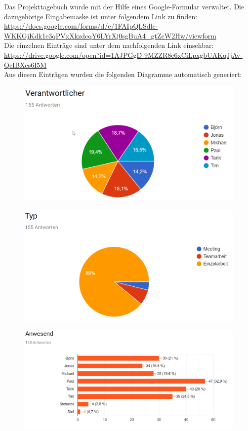 Das Projekttagebuch wurde mit der Hilfe eines Google-Formular verwaltet. Die dazugehörige Eingabemaske ist unter folgendem Link zu finden: \url{https://docs.google.com/forms/d/e/1FAIpQLSdlc-WKKGjKdk1e3qPVxXkzdcqY6LYrXj0sgBuA4_gtZcW2Hw/viewform}\\
Die einzelnen Einträge sind unter dem nachfolgenden Link einsehbar: \url{https://drive.google.com/open?id=1AJPGgD-9MZZR8e6xCiLpxgbUAKqJjAv-QcIBXes6I5M}\\
Aus diesen Einträgen wurden die folgenden Diagramme automatisch generiert:

\begin{figure}[H]
    \centering
    \includegraphics[width=\textwidth]{../Endabnahme/images/Verantwortlicher_Chart.png}
\end{figure}

\begin{figure}[H]
    \centering
    \includegraphics[width=\textwidth]{../Endabnahme/images/Typ_Chart.png}
\end{figure}

\begin{figure}[H]
    \centering
    \includegraphics[width=\textwidth]{../Endabnahme/images/Anwesend_Chart.png}
\end{figure}
